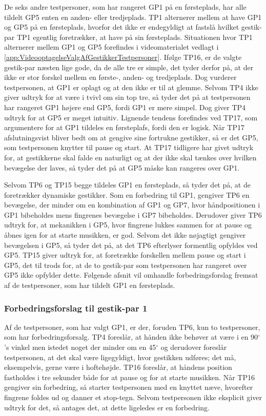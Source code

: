 De seks andre testpersoner, som har rangeret GP1 på en førsteplads, har alle tildelt GP5 enten en anden- eller tredjeplads. TP1 alternerer mellem at have GP1 og GP5 på en førsteplads, hvorfor det ikke er endegyldigt at fastslå hvilket gestik-par TP1 egentlig foretrækker, at have på sin førsteplads. Situationen hvor TP1 alternerer mellem GP1 og GP5 forefindes i videomaterialet vedlagt i \autoref{app:VideooptagelseValgAfGestikkerTestpersoner}. Ifølge TP16, er de valgte gestik-par næsten lige gode, da de alle tre er simple, det tyder derfor på, at der ikke er stor forskel mellem en første-, anden- og tredjeplads. Dog vurderer testpersonen, at GP1 er oplagt og at den ikke er til at glemme. Selvom TP4 ikke giver udtryk for at være i tvivl om sin top tre, så tyder det på at testpersonen har rangeret GP1 højere end GP5, fordi GP1 er mere simpel. Dog giver TP4 udtryk for at GP5 er meget intuitiv. Lignende tendens forefindes ved TP17, som argumentere for at GP1 tildeles en førsteplafs, fordi den er logisk. Når TP17 afslutningsvist bliver bedt om at gengive sine fortrukne gestikker, så er det GP5, som testpersonen knytter til pause og start. At TP17 tidligere har givet udtryk for, at gestikkerne skal falde en naturligt og at der ikke skal tænkes over hvilken bevægelse der laves, så tyder det på at GP5 måske kan rangeres over GP1.

Selvom TP6 og TP15 begge tildeles GP1 en førsteplads, så tyder det på, at de foretrækker dynamiske gestikker. Som en forbedring til GP1, gengiver TP6 en bevægelse, der minder om en kombination af GP1 og GP7, hvor håndpositionen i GP1 bibeholdes mens fingrenes bevægelse i GP7 bibeholdes. Derudover giver TP6 udtryk for, at mekanikken i GP5, hvor fingrene lukkes sammen for at pause og åbnes igen for at starte musikken, er god. Selvom det ikke nøjagtigt gengiver bevægelsen i GP5, så tyder det på, at det TP6 efterlyser formentlig opfyldes ved GP5. TP15 giver udtryk for, at foretrække forskellen mellem pause og start i GP5, det til trods for, at de to gestik-par som testpersonen har rangeret over GP5 ikke opfylder dette.\blankline
%
Følgende afsnit vil omhandle forbedringsforslag fremsat af de testpersoner, som har tildelt GP1 en førsteplads.
%
\subsubsection{Forbedringsforslag til gestik-par 1}
\label{TestresultaterValgAfGestikkerForbedringGP1Pause}
%
Af de testpersoner, som har valgt GP1, er der, foruden TP6, kun to testpersoner, som har forbedringsforsalg. TP4 foreslår, at hånden ikke behøver at være i en 90$^{\circ}$'s vinkel men istedet noget der minder om en 45$^{\circ}$ og derudover foreslår testpersonen, at det skal være ligegyldigt, hvor gestikken udføres; det må, eksempelvis, gerne være i hoftehøjde. TP16 foreslår, at håndens position fastholdes i tre sekunder både for at pause og for at starte musikken. Når TP16 gengiver sin forbedring, så starter testpersonen med en knyttet næve, hvorefter fingrene foldes ud og danner et stop-tegn. Selvom testpersonen ikke eksplicit giver udtryk for det, så antages det, at dette ligeledes er en forbedring.
%
